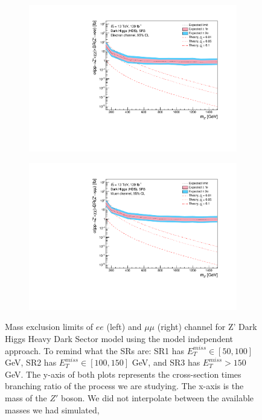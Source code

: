 \documentclass[12pt, a4paper]{book}
\begin{document}
\begin{figure}[!ht]
\begin{subfigure}[b]{0.49\textwidth}
      \includegraphics[width=1\textwidth]{Limits/Model_independent/150/DH_HDS/mass_exclusion_ee.pdf}
   \end{subfigure}
   \hfill
   \begin{subfigure}[b]{0.49\textwidth}
      \centering
      \includegraphics[width=1\textwidth]{Limits/Model_independent/150/DH_HDS/mass_exclusion_uu.pdf}
   \end{subfigure}
   \caption[Expected mass exclusion limits results for DH HDS model on $ee$ and $\mu\mu$ channel using the model independent approach]{Mass exclusion limits of $ee$ (left) and $\mu\mu$ (right) channel for Z' Dark Higgs Heavy Dark Sector model using the model independent approach. To remind what the SRs are: SR1 has $E_T^{miss}\in[50, 100]$ GeV, SR2 has $E_T^{miss}\in[100, 150]$ GeV, and SR3 has $E_T^{miss}>150$ GeV. The y-axis of both plots represents the cross-section times branching ratio of the process we are studying. The x-axis is the mass of the $Z'$ boson. We did not interpolate between the available masses we had simulated, 
}
\end{figure}
\end{document}
